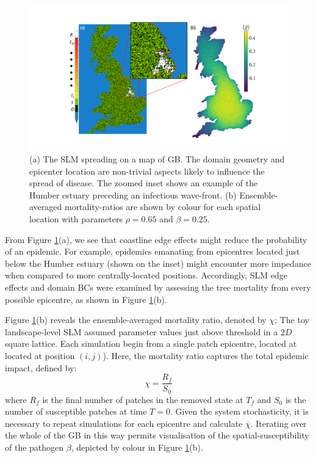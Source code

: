 \begin{figure}
    \centering
    \includegraphics[scale=0.32]{chapter4/figures/figure1-GB-BCs.pdf}
    \caption{(a) The SLM spreading on a map of GB. The domain geometry and epicenter %
    location are non-trivial aspects likely to influence the spread of disease. The zoomed inset %
    shows an example of the Humber estuary preceding an infectious wave-front. 
    (b) Ensemble-averaged mortality-ratios are shown by colour for each spatial location with 
        parameters $\rho=0.65$ and $\beta=0.25$.}
    \label{fig:uk-spread-primer}
\end{figure}

From Figure \ref{fig:uk-spread-primer}(a), we see that coastline edge effects
might reduce the probability of an epidemic.
For example, epidemics emanating from epicentres located just below the 
Humber estuary (shown on the inset) might encounter more impedance when 
compared to more centrally-located positions.
Accordingly, SLM edge effects and domain BCs were examined by assessing the 
tree mortality from every possible epicentre, as shown in Figure \ref{fig:uk-spread-primer}(b).

Figure \ref{fig:uk-spread-primer}(b) reveals the ensemble-averaged mortality 
ratio, denoted by $\chi$;
The toy landscape-level SLM assumed parameter values just above threshold in a $2D$ square lattice. 
Each simulation begin from a single patch epicentre, located at located at position $(i, j)$).
Here, the mortality ratio captures the total epidemic impact, defined by: 
\begin{equation}
\label{eq:epi_impact}
    \chi=\frac{R_f}{S_0}
\end{equation}
where $R_f$ is the final number of patches in the removed state at $T_f$ and $S_0$ is the number of susceptible %
patches at time $T=0$.
Given the system stochasticity, it is necessary to repeat simulations for each epicentre %
and calculate $\overline{\chi}$. Iterating over the whole of the GB in this way permits visualisation
of the spatial-susceptibility of the pathogen $\beta$, depicted by colour in Figure \ref{fig:uk-spread-primer}(b).

